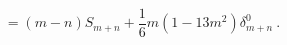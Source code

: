 \begin{equation}
[S_{m} , S_{n}] = (m-n) S_{m+n} + \frac{1}{6} m(1-13m^{2})
\delta^{0}_{m+n}~. 
\end{equation}

